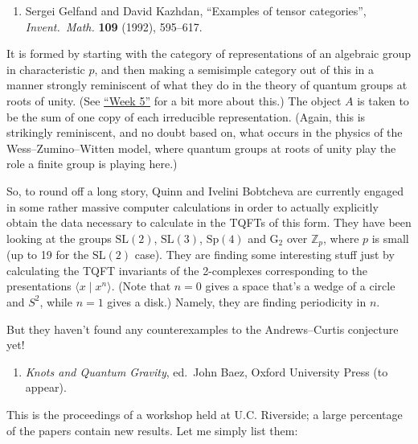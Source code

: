 \documentclass[12pt]{article}
\def\tightlist{}
\begin{document}
\begin{enumerate}
\def\labelenumi{\arabic{enumi})}
\setcounter{enumi}{4}
\tightlist
\item
  Sergei Gelfand and David Kazhdan, ``Examples of tensor categories'',
  \emph{Invent.\ Math.} \textbf{109} (1992), 595--617.
\end{enumerate}

It is formed by starting with the category of representations of an
algebraic group in characteristic \(p\), and then making a semisimple
category out of this in a manner strongly reminiscent of what they do in
the theory of quantum groups at roots of unity. (See
\protect\hyperlink{week5}{``Week 5''} for a bit more about this.) The
object \(A\) is taken to be the sum of one copy of each irreducible
representation. (Again, this is strikingly reminiscent, and no doubt
based on, what occurs in the physics of the Wess--Zumino--Witten model,
where quantum groups at roots of unity play the role a finite group is
playing here.)

So, to round off a long story, Quinn and Ivelini Bobtcheva are currently
engaged in some rather massive computer calculations in order to
actually explicitly obtain the data necessary to calculate in the TQFTs
of this form. They have been looking at the groups \(\mathrm{SL}(2)\),
\(\mathrm{SL}(3)\), \(\mathrm{Sp}(4)\) and \(\mathrm{G}_2\) over
\(\mathbb{Z}_p\), where \(p\) is small (up to 19 for the
\(\mathrm{SL}(2)\) case). They are finding some interesting stuff just
by calculating the TQFT invariants of the 2-complexes corresponding to
the presentations \(\langle x \mid x^n \rangle\). (Note that \(n = 0\)
gives a space that's a wedge of a circle and \(S^2\), while \(n = 1\)
gives a disk.) Namely, they are finding periodicity in \(n\).

But they haven't found any counterexamples to the Andrews--Curtis
conjecture yet!

\begin{enumerate}
\def\labelenumi{\arabic{enumi})}
\setcounter{enumi}{5}
\tightlist
\item
  \emph{Knots and Quantum Gravity}, ed.~John Baez, Oxford University
  Press (to appear).
\end{enumerate}

This is the proceedings of a workshop held at U.C. Riverside; a large
percentage of the papers contain new results. Let me simply list them:
\end{document}
